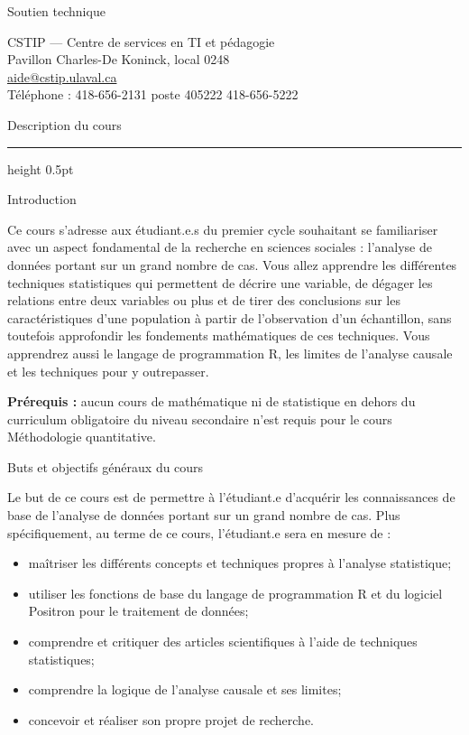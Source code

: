 \documentclass[10pt]{article}
\newcommand{\ulsection}[1]{%
  \needspace{4\baselineskip}%
  \vspace{14pt}%
  {\headfont\fontsize{17}{20}\selectfont #1}\par
  \vspace{3pt}%
  {\color{ulrule}\hrule height 0.5pt}%
  \vspace{6pt}%
}
\newcommand{\ulsub}[1]{%
  \needspace{3\baselineskip}%
  \vspace{10pt}%
  {\headfont\fontsize{12.5}{15}\selectfont #1}\par
  \vspace{2pt}%
}
\begin{document}
\ulsub{Soutien technique}
{\fontsize{9.5}{12.5}\selectfont
CSTIP --- Centre de services en TI et pédagogie\\
Pavillon Charles-De Koninck, local 0248\\
\href{mailto:aide@cstip.ulaval.ca}{aide@cstip.ulaval.ca}\\
Téléphone : 418-656-2131 poste 405222 \textbar{} 418-656-5222\par}

\newpage

\ulsection{Description du cours}

\ulsub{Introduction}
{\fontsize{9.5}{12.5}\selectfont
Ce cours s'adresse aux étudiant.e.s du premier cycle souhaitant se familiariser avec un aspect fondamental de la recherche en sciences sociales : l'analyse de données portant sur un grand nombre de cas. Vous allez apprendre les différentes techniques statistiques qui permettent de décrire une variable, de dégager les relations entre deux variables ou plus et de tirer des conclusions sur les caractéristiques d'une population à partir de l'observation d'un échantillon, sans toutefois approfondir les fondements mathématiques de ces techniques. Vous apprendrez aussi le langage de programmation R, les limites de l'analyse causale et les techniques pour y outrepasser.\par
\vspace{6pt}
\textbf{Prérequis :} aucun cours de mathématique ni de statistique en dehors du curriculum obligatoire du niveau secondaire n'est requis pour le cours Méthodologie quantitative.\par}

\ulsub{Buts et objectifs généraux du cours}
{\fontsize{9.5}{12.5}\selectfont
Le but de ce cours est de permettre à l'étudiant.e d'acquérir les connaissances de base de l'analyse de données portant sur un grand nombre de cas. Plus spécifiquement, au terme de ce cours, l'étudiant.e sera en mesure de :
\begin{itemize}
  \item maîtriser les différents concepts et techniques propres à l'analyse statistique;
  \item utiliser les fonctions de base du langage de programmation R et du logiciel Positron pour le traitement de données;
  \item comprendre et critiquer des articles scientifiques à l'aide de techniques statistiques;
  \item comprendre la logique de l'analyse causale et ses limites;
  \item concevoir et réaliser son propre projet de recherche.
\end{itemize}\par}
\end{document}

